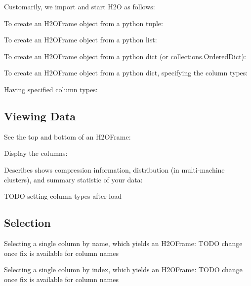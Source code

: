 Customarily, we import and start H2O as follows:


To create an H2OFrame object from a python tuple:


To create an H2OFrame object from a python list:


To create an H2OFrame object from a python dict (or collections.OrderedDict):


To create an H2OFrame object from a python dict, specifying the column types:


Having specified column types:


\subsection{Viewing Data}
See the top and bottom of an H2OFrame:


Display the columns:


Describes shows compression information, distribution (in multi-machine clusters), and summary statistic of your data:
\small

\normalsize

TODO setting column types after load


\subsection{Selection}
Selecting a single column by name, which yields an H2OFrame:
TODO change once fix is available for column names


Selecting a single column by index, which yields an H2OFrame:
TODO change once fix is available for column names



